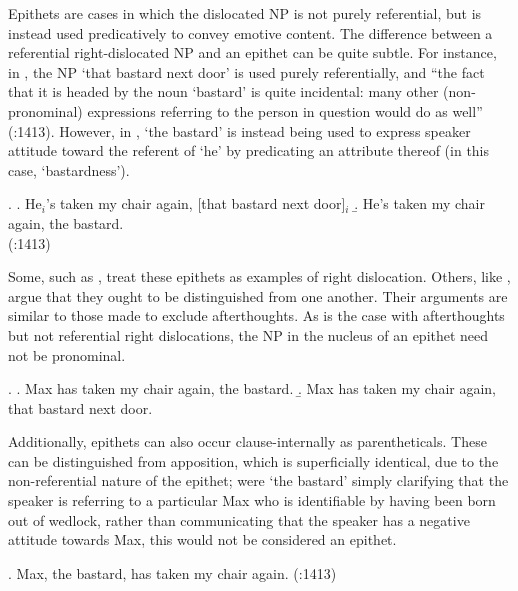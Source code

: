 \documentclass[titlepage,12pt]{article}
\def\verymarginal{{\leavevmode\llap{??}}}
\begin{document}
Epithets are cases in which the dislocated NP is not purely referential, but is instead used predicatively to convey emotive content. The difference between a referential right-dislocated NP and an epithet can be quite subtle. For instance, in \Next[a], the NP `that bastard next door' is used purely referentially, and ``the fact that it is headed by the noun `bastard' is quite incidental: many other (non-pronominal) expressions referring to the person in question would do as well'' (\citealt{huddleston_cambridge_2002}:1413). However, in \Next[b], `the bastard' is instead being used to express speaker attitude toward the referent of `he' by predicating an attribute thereof (in this case, `bastardness'). 

\ex. \a. He$_i$'s taken my chair again, [that bastard next door]$_i$
\b. He's taken my chair again, the bastard.\\
\phantom{x}\hfill (\citealt{huddleston_cambridge_2002}:1413)

\par
Some, such as \citet{ziv_right_1994}, treat these epithets as examples of right dislocation. Others, like \citet{huddleston_cambridge_2002}, argue that they ought to be distinguished from one another. Their arguments are similar to those made to exclude afterthoughts. As is the case with afterthoughts but not referential right dislocations, the NP in the nucleus of an epithet need not be pronominal.

\ex. \a. Max has taken my chair again, the bastard.
\b. \verymarginal Max has taken my chair again, that bastard next door.

Additionally, epithets can also occur clause-internally as parentheticals. These can be distinguished from apposition, which is superficially identical, due to the non-referential nature of the epithet; were `the bastard' simply clarifying that the speaker is referring to a particular Max who is identifiable by having been born out of wedlock, rather than communicating that the speaker has a negative attitude towards Max, this would not be considered an epithet.

\ex. Max, the bastard, has taken my chair again. \hfill(\citealt{huddleston_cambridge_2002}:1413)

\end{document}
